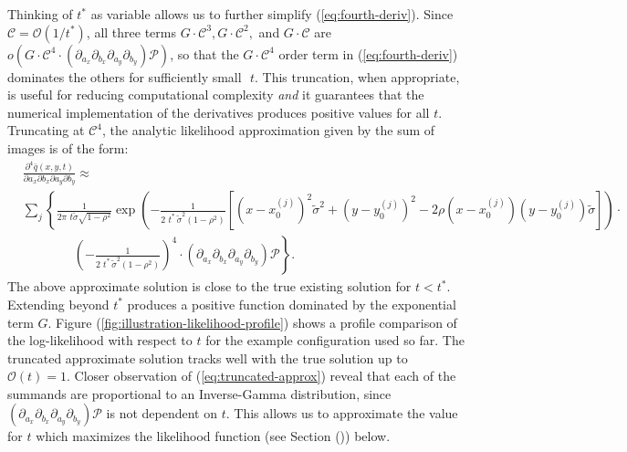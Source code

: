 \documentclass[10pt]{article}
\begin{document}
Thinking of $t^{*}$ as variable allows us to further simplify
(\ref{eq:fourth-deriv}). Since $\mathcal{C} = \mathcal{O}(1/t^{*})$,
all three terms $G\cdot \mathcal{C}^3, G\cdot \mathcal{C}^2,$ and
$G\cdot \mathcal{C}$ are
$o\left( G\cdot \mathcal{C}^4 \cdot \left(\partial_{a_x}\partial_{b_x}
    \partial_{a_y}\partial_{b_y} \right)\mathcal{P} \right)$, so that
the $G\cdot \mathcal{C}^4$ order term in (\ref{eq:fourth-deriv})
dominates the others for sufficiently small $\,\,t$. This truncation,
when appropriate, is useful for reducing computational complexity
\textit{and} it guarantees that the numerical implementation of the
derivatives produces positive values for all $t$. Truncating at
$\mathcal{C}^4$, the analytic likelihood approximation given by the
sum of images is of the form:
\begin{align}
  &\frac{\partial^4 \bar{q}(x, y, t)}{\partial a_x
  \partial b_x \partial a_y \partial b_y} \approx  & \nonumber \\
  &\sum_{j} \left\{ \frac{1}{2\pi\,\, t\tilde{\sigma}\sqrt{1-\rho^2}} \exp\left(
    -\frac{1}{2\,\,t^*\, \tilde{\sigma}^2 (1-\rho^2)} \left[
      \left(x-x_0^{(j)}\right)^2 \tilde{\sigma}^2 +
      \left(y-y_0^{(j)}\right)^2 -
      2\rho(x-x_0^{(j)})(y-y_0^{(j)})\tilde{\sigma} \right]\right)
    \cdot \right. & \nonumber \\
  &\qquad \qquad \left. \left( -\frac{1}{2\,\,t^*\, \tilde{\sigma}^2 (1-\rho^2)} \right)^4 \cdot \left(\partial_{a_x}\partial_{b_x}
    \partial_{a_y}\partial_{b_y} \right)\mathcal{P} \right\}. & \label{eq:truncated-approx}
\end{align}
The above approximate solution is close to the true existing solution
for $t < t^*$. Extending beyond $t^*$ produces a positive function
dominated by the exponential term $G$. Figure
(\ref{fig:illustration-likelihood-profile}) shows a profile comparison
of the log-likelihood with respect to $t$ for the example
configuration used so far. The truncated approximate solution tracks
well with the true solution up to $\mathcal{O}(t) = 1$. Closer
observation of (\ref{eq:truncated-approx}) reveal that each of the
summands are proportional to an Inverse-Gamma distribution, since
$\left(\partial_{a_x}\partial_{b_x} \partial_{a_y}\partial_{b_y}
\right)\mathcal{P}$ is not dependent on $t$. This allows us to
approximate the value for $t$ which maximizes the likelihood
function (see Section ()) below.
\end{document}
